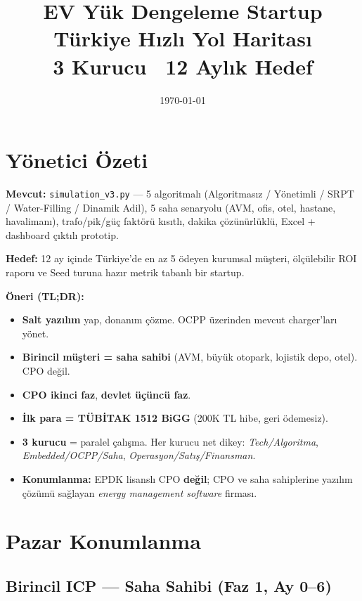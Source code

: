 \documentclass[11pt,a4paper]{article}
\title{\textbf{EV Yük Dengeleme Startup}\\
       Türkiye Hızlı Yol Haritası\\
       \large 3 Kurucu \textbar\ 12 Aylık Hedef}
\author{}
\date{\today}
\begin{document}
\maketitle

\section*{Yönetici Özeti}

\textbf{Mevcut:} \texttt{simulation\_v3.py} --- 5 algoritmalı (Algoritmasız / Yönetimli / SRPT / Water-Filling / Dinamik Adil), 5 saha senaryolu (AVM, ofis, otel, hastane, havalimanı), trafo/pik/güç faktörü kısıtlı, dakika çözünürlüklü, Excel + dashboard çıktılı prototip.

\textbf{Hedef:} 12 ay içinde Türkiye'de en az 5 ödeyen kurumsal müşteri, ölçülebilir ROI raporu ve Seed turuna hazır metrik tabanlı bir startup.

\textbf{Öneri (TL;DR):}
\begin{itemize}
    \item \textbf{Salt yazılım} yap, donanım çözme. OCPP üzerinden mevcut charger'ları yönet.
    \item \textbf{Birincil müşteri = saha sahibi} (AVM, büyük otopark, lojistik depo, otel). CPO değil.
    \item \textbf{CPO ikinci faz}, \textbf{devlet üçüncü faz}.
    \item \textbf{İlk para = TÜBİTAK 1512 BiGG} (200K TL hibe, geri ödemesiz).
    \item \textbf{3 kurucu} = paralel çalışma. Her kurucu net dikey: \textit{Tech/Algoritma}, \textit{Embedded/OCPP/Saha}, \textit{Operasyon/Satış/Finansman}.
    \item \textbf{Konumlanma:} EPDK lisanslı CPO \textbf{değil}; CPO ve saha sahiplerine yazılım çözümü sağlayan \textit{energy management software} firması.
\end{itemize}

\section{Pazar Konumlanma}

\subsection{Birincil ICP --- Saha Sahibi (Faz 1, Ay 0--6)}
\end{document}
